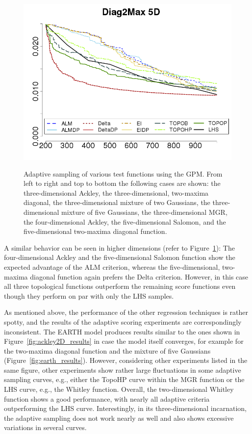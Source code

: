\begin{figure}[htbp]
\begin{center}
   \includegraphics[width=0.24\linewidth]{figs/chap5/gpm_Diag2Max_5D_td=200}\label{fig:2diag5D_gpm}
  \caption{Adaptive sampling of various test functions using the GPM. From left to right and top to bottom the following cases are shown: the three-dimensional Ackley,
  the three-dimensional, two-maxima diagonal, the three-dimensional mixture of two Gaussians, the three-dimensional mixture of five Gaussians, the three-dimensional MGR, the four-dimensional Ackley, the five-dimensional Salomon, and the five-dimensional two-maxima diagonal function.}
  \label{fig:345D_gpm}
  \end{center}
\end{figure}

A similar behavior can be seen in higher dimensions (refer to Figure~\ref{fig:345D_gpm}): The four-dimensional Ackley and the five-dimensional Salomon function show the expected advantage of the ALM criterion, whereas the five-dimensional, two-maxima diagonal function again prefers the Delta criterion.
%
However, in this case all three topological functions outperform the remaining score functions even though they perform on par with only the LHS samples.

As mentioned above, the performance of the other regression techniques is rather spotty, and the results of the adaptive scoring experiments are correspondingly inconsistent.
%
The EARTH model produces results similar to the ones shown in Figure~\ref{fig:ackley2D_results} in case the model itself converges, for example for the two-maxima diagonal function and the mixture of five Gaussians (Figure~\ref{fig:earth_results}).
%
However, considering other experiments listed in the same figure, other experiments show rather large fluctuations in some adaptive sampling curves, e.g., either the TopoHP curve within the MGR function or the LHS curve, e.g., the Whitley function.
%
Overall, the two-dimensional Whitley function shows a good performance, with nearly all adaptive criteria outperforming the LHS curve.
%
Interestingly, in its three-dimensional incarnation, the adaptive sampling does not work nearly as well and also shows excessive variations in several curves.


